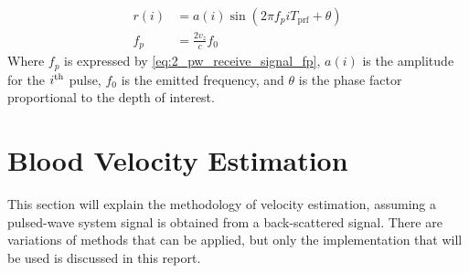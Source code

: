 \begin{subequations}
	\begin{align}
		r(i) &= a(i) \sin \left( 2\pi f_{p}i T_{\mathrm{prf}} +\theta \right) \label{eq:2_pw_receive_signal_i} \\
		f_{p} &= \frac{2v_{z}}{c}f_{0} \label{eq:2_pw_receive_signal_fp}
	\end{align}
\end{subequations}
Where $f_{p}$ is expressed by \cref{eq:2_pw_receive_signal_fp}, $a(i)$ is the amplitude for the $i\textsuperscript{th}$ pulse, $f_{0}$ is the emitted frequency, and $\theta$ is the phase factor proportional to the depth of interest.
\section{Blood Velocity Estimation}
This section will explain the methodology of velocity estimation, assuming a pulsed-wave system signal is obtained from a back-scattered signal. There are variations of methods that can be applied, but only the implementation that will be used is discussed in this report.

